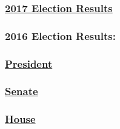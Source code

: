 \hypertarget{2017-election-results}{%
\subsubsection{\texorpdfstring{\href{https://www.nytimes3xbfgragh.onion/interactive/2017/us/elections/election-calendar.html}{2017
Election Results}}{2017 Election Results}}\label{2017-election-results}}

\hypertarget{2016-election-results}{%
\subsubsection{2016 Election Results:}\label{2016-election-results}}

\hypertarget{president}{%
\subsubsection{\texorpdfstring{\href{https://www.nytimes3xbfgragh.onion/elections/results/president}{President}}{President}}\label{president}}

\hypertarget{senate}{%
\subsubsection{\texorpdfstring{\href{https://www.nytimes3xbfgragh.onion/elections/results/senate}{Senate}}{Senate}}\label{senate}}

\hypertarget{house}{%
\subsubsection{\texorpdfstring{\href{https://www.nytimes3xbfgragh.onion/elections/results/house}{House}}{House}}\label{house}}

